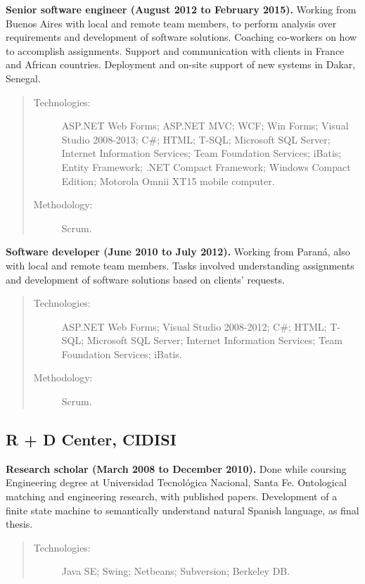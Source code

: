 \textbf{Senior software engineer (August 2012 to February 2015).} Working from Buenos Aires with local and remote team members, to perform analysis over requirements and development of software solutions. Coaching co-workers on how to accomplish assignments. Support and communication with clients in France and African countries. Deployment and on-site support of new systems in Dakar, Senegal.

\begin{quote}
\begin{description}
    \item[Technologies:] ASP.NET Web Forms; ASP.NET MVC; WCF; Win Forms; Visual Studio 2008-2013; C\#; HTML; T-SQL; Microsoft SQL Server; Internet Information Services; Team Foundation Services; iBatis; Entity Framework; .NET Compact Framework; Windows Compact Edition; Motorola Omnii XT15 mobile computer.
    \item[Methodology:] Scrum.
\end{description}
\end{quote}

\textbf{Software developer (June 2010 to July 2012).} Working from Paraná, also with local and remote team members. Tasks involved understanding assignments and development of software solutions based on clients' requests.

\begin{quote}
\begin{description}
    \item[Technologies:] ASP.NET Web Forms; Visual Studio 2008-2012; C\#; HTML; T-SQL; Microsoft SQL Server; Internet Information Services; Team Foundation Services; iBatis.
    \item[Methodology:] Scrum.
\end{description}
\end{quote}

\subsection*{R + D Center, CIDISI}

\textbf{Research scholar (March 2008 to December 2010).} Done while coursing Engineering degree at Universidad Tecnológica Nacional, Santa Fe. Ontological matching and engineering research, with published papers. Development of a finite state machine to semantically understand natural Spanish language, as final thesis.

\begin{quote}
\begin{description}
    \item[Technologies:] Java SE; Swing; Netbeans; Subversion; Berkeley DB.    
\end{description}
\end{quote}